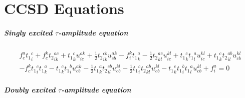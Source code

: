 \chapter{CCSD Equations}

\paragraph{Singly excited $\tau$-amplitude equation}

\begin{gather*}
f^{a}_{c} {t_1}^{c}_{i} 
+ f^{k}_{c} {t_2}^{ac}_{ik} 
+ {t_1}^{c}_{k} u^{ak}_{ic}
+ \frac{1}{2}{t_2}^{cb}_{ik} u^{ak}_{cb} 
- f^{k}_{i} {t_1}^{a}_{k}
- \frac{1}{2}{t_2}^{ac}_{kl} u^{kl}_{ic}
+ {t_1}^{c}_{k} {t_1}^{a}_{l} u^{kl}_{ic} 
 + {t_1}^{c}_{k} {t_2}^{ab}_{il} u^{kl}_{cb} \\
- f^{k}_{c} {t_1}^{c}_{i} {t_1}^{a}_{k}
- {t_1}^{c}_{k} {t_1}^{b}_{i} u^{ak}_{cb}
- \frac{1}{2}{t_1}^{a}_{k} {t_2}^{cb}_{il} u^{kl}_{cb}
- \frac{1}{2}{t_1}^{c}_{i} {t_2}^{ab}_{kl} u^{kl}_{cb}
- {t_1}^{c}_{k} {t_1}^{b}_{i} {t_1}^{a}_{l} u^{kl}_{cb}
+ f^{a}_{i}
= 0
\end{gather*}

\paragraph{Doubly excited $\tau$-amplitude equation}

